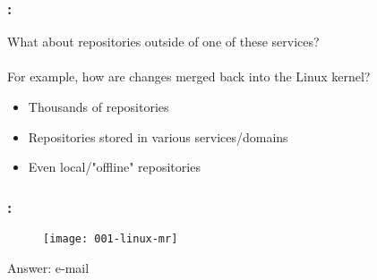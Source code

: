 \begin{frame}
    \frametitle{\secname: \small\subsecname\normalsize}

    What about repositories outside of one of these services? \\~\\

    For example, how are changes merged back into the Linux kernel?

    \begin{itemize}
        \item Thousands of repositories
        \item Repositories stored in various services/domains
        \item Even local/"offline" repositories
    \end{itemize}
\end{frame}

\begin{frame}
    \frametitle{\secname: \small\subsecname\normalsize}

    \begin{figure}[h]
        \texttt{[image: 001-linux-mr]}
        \centering
    \end{figure}

    Answer: e-mail
\end{frame}
